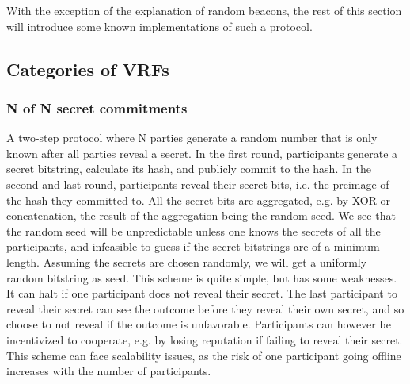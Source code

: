 With the exception of the explanation of random beacons, the rest of this section will introduce some known implementations of such a protocol.

\subsection{Categories of VRFs}

\subsubsection{N of N  secret commitments}
A two-step protocol where N parties generate a random number that is only known after all parties reveal a secret.
In the first round, participants generate a secret bitstring, calculate its hash, and publicly commit to the hash. In the second and last round, participants reveal their secret bits, i.e. the preimage of the hash they committed to. All the secret bits are aggregated, e.g. by XOR or concatenation, the result of the aggregation being the random seed. We see that the random seed will be unpredictable unless one knows the secrets of all the participants, and infeasible to guess if the secret bitstrings are of a minimum length. Assuming the secrets are chosen randomly, we will get a uniformly random bitstring as seed.
This scheme is quite simple, but has some weaknesses. It can halt if one participant does not reveal their secret. The last participant to reveal their secret can see the outcome before they reveal their own secret, and so choose to not reveal if the outcome is unfavorable. Participants can however be incentivized to cooperate, e.g. by losing reputation if failing to reveal their secret. This scheme can face scalability issues, as the risk of one participant going offline increases with the number of participants.

